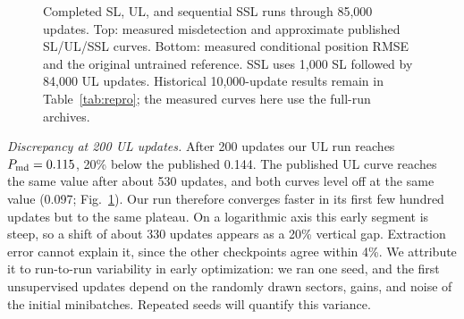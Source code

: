 \documentclass[conference]{IEEEtran}
\begin{document}
\begin{figure}[t]\centering
{}
\caption{Completed SL, UL, and sequential SSL runs through 85,000 updates. Top: measured misdetection and approximate published SL/UL/SSL curves. Bottom: measured conditional position RMSE and the original untrained reference. SSL uses 1,000 SL followed by 84,000 UL updates. Historical 10,000-update results remain in Table~\ref{tab:repro}; the measured curves here use the full-run archives.}
\label{fig:learning}
\end{figure}

\emph{Discrepancy at 200 UL updates.} After 200 updates our UL run reaches $P_{\rm md}=0.115$, 20\% below the published 0.144. The published UL curve reaches the same value after about 530 updates, and both curves level off at the same value (0.097; Fig.~\ref{fig:learning}). Our run therefore converges faster in its first few hundred updates but to the same plateau. On a logarithmic axis this early segment is steep, so a shift of about 330 updates appears as a 20\% vertical gap. Extraction error cannot explain it, since the other checkpoints agree within 4\%. We attribute it to run-to-run variability in early optimization: we ran one seed, and the first unsupervised updates depend on the randomly drawn sectors, gains, and noise of the initial minibatches. Repeated seeds will quantify this variance.
\end{document}
